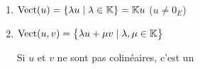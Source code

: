 \begin{frame} 

\small
\begin{enumerate}\setlength{\itemsep}{4pt}
  \item {} $\mathop{\text{Vect}}\nolimits (u) =\{ \lambda u \mid \lambda \in \mathbb{K} \} = \mathbb{K} u$ \quad ($u\neq 0_E$)



\vspace*{-4ex} 
  \item $\mathop{\text{Vect}}\nolimits (u,v) = \big\{ \lambda u + \mu v \mid \lambda, \mu \in \mathbb{K} \big\}$
  
  Si $u$ et $v$ ne sont pas colinéaires, c'est un 
 
  \pause
 

\end{enumerate}
\end{frame}
